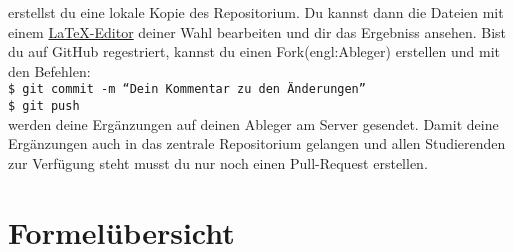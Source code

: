 \documentclass[12pt]{article} %
\numberwithin{equation}{subsection}
\begin{document}
	erstellst du eine lokale Kopie des Repositorium. Du kannst dann die Dateien mit einem \href{https://www.latex-project.org/get/}{\LaTeX-Editor} deiner Wahl bearbeiten und dir das Ergebniss ansehen. Bist du auf GitHub regestriert, kannst du einen Fork(engl:Ableger) erstellen und mit den Befehlen:\\
	\texttt{\$ git commit -m ``Dein Kommentar zu den Änderungen''}\\
	\texttt{\$ git push}\\
	werden deine Ergänzungen auf deinen Ableger am Server gesendet. Damit deine Ergänzungen auch in das zentrale Repositorium gelangen und allen Studierenden zur Verfügung steht musst du nur noch einen Pull-Request erstellen.
	\newpage
	
	\section{Formelübersicht} %
\end{document}

